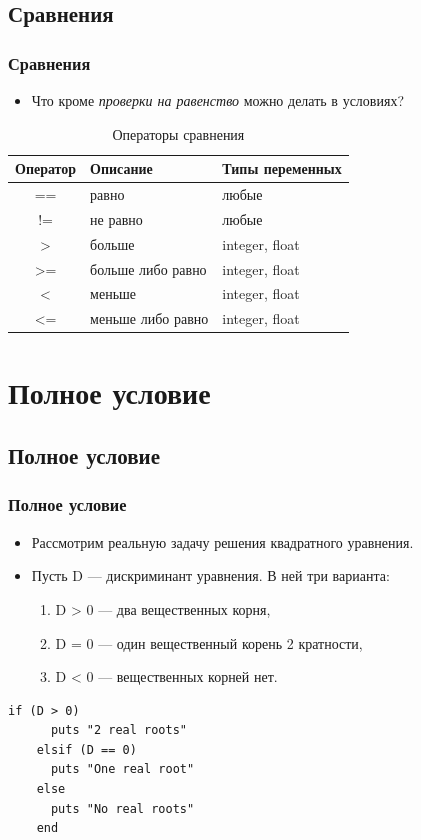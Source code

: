 \documentclass[compress,red]{beamer}
\begin{document}
\subsection{Сравнения}
\begin{frame}
  \frametitle{Сравнения}
  \begin{itemize}
    \item Что кроме \emph{проверки на равенство} можно делать в условиях?
  \end{itemize}
  \begin{center}
  \begin{table}
  \begin{tabular}{|c|l|l|}
  \hline
  Оператор & Описание & Типы переменных \\
  \hline
  == & равно & любые \\
  \hline
  != & не равно & любые \\
  \hline
  > & больше & integer, float \\
  \hline
  >= & больше либо равно & integer, float \\
  \hline
  < & меньше & integer, float \\
  \hline
  <= & меньше либо равно & integer, float \\
  \hline
  \end{tabular}
  \caption{Операторы сравнения}
  \end{table}
  \end{center}
  
\end{frame}

\section{Полное условие}
\subsection{Полное условие}
\begin{frame}[fragile]
  \frametitle{Полное условие}
  \begin{itemize}
    \item Рассмотрим реальную задачу решения квадратного уравнения.
    \item Пусть D --- дискриминант уравнения. В ней три варианта: 
      \begin{enumerate}
        \item D > 0 --- два вещественных корня,
        \item D = 0 --- один вещественный корень 2 кратности,
        \item D < 0 --- вещественных корней нет.
      \end{enumerate}
  \end{itemize}
  \scriptsize{
  \begin{lstlisting}[label=ruby7,caption=Пример полного условия]
    if (D > 0)
      puts "2 real roots"
    elsif (D == 0)
      puts "One real root"
    else
      puts "No real roots"
    end
  \end{lstlisting}}

\end{frame}
\end{document}
